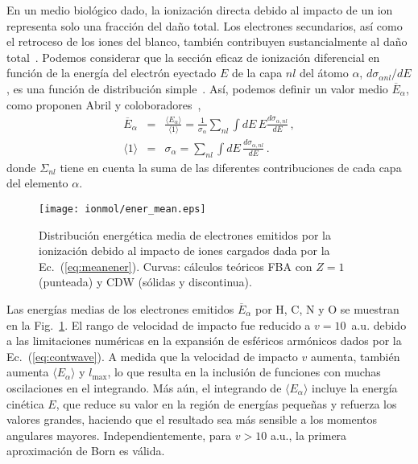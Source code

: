 En un medio biológico dado, la ionización directa debido al impacto de un 
ion representa solo una fracción del daño total. Los electrones 
secundarios, así como el retroceso de los iones del blanco, también 
contribuyen sustancialmente al daño total~\cite{Denifl:11}. Podemos 
considerar que la sección eficaz de ionización diferencial en función de 
la energía del electrón eyectado $E$ de la capa $nl$ del átomo $\alpha$,
$d\sigma_{\alpha nl}/dE$, es una función de distribución 
simple~\cite{Surdutovic:18}. Así, podemos definir un valor medio 
$\overline{E}_{\alpha}$, como proponen Abril y 
coloboradores~\cite{Abril:15},
\begin{eqnarray}
\overline{E}_{\alpha} &=&\frac{\langle E_{\alpha}\rangle}{\langle
1\rangle}=\frac{1}{\sigma_{\alpha}}\sum\limits_{nl}\int dE\,E
\frac{d\sigma_{\alpha,nl}}{dE}\,,  
\label{eq:meanener} \\
\langle 1\rangle &=&\sigma_{\alpha}=\sum\limits_{nl}\int dE\,
\frac{d\sigma_{\alpha,nl}}{dE}\,. 
\label{eq:normener}
\end{eqnarray}
donde $\Sigma_{nl}$ tiene en cuenta la suma de las diferentes 
contribuciones de cada capa del elemento $\alpha$.

\begin{figure}
\centering
\texttt{[image: ionmol/ener\_mean.eps]}
\caption[Distribución energética media de electrones emitidos.]
{Distribución energética media de electrones emitidos por la ionización 
debido al impacto de iones cargados dada por la Ec.~(\ref{eq:meanener}). 
Curvas: cálculos teóricos FBA con $Z=1$ (punteada) y CDW (sólidas y 
discontinua).}
\label{fig:emittedener}
\end{figure} 

Las energías medias de los electrones emitidos $\overline{E}_{\alpha}$ 
por H, C, N y O se muestran en la Fig.~\ref{fig:emittedener}. El rango 
de velocidad de impacto fue reducido a $v=10$~a.u. debido a las 
limitaciones numéricas en la expansión de esféricos armónicos dados por 
la Ec.~(\ref{eq:contwave}). A medida que la velocidad de impacto $v$ 
aumenta, también aumenta $\langle E_{\alpha}\rangle$ y $l_{\max}$, lo que 
resulta en la inclusión de funciones con muchas oscilaciones en el 
integrando. Más aún, el integrando de $\langle E_{\alpha}\rangle$ incluye 
la energía cinética $E$, que reduce su valor en la región de energías 
pequeñas y refuerza los valores grandes, haciendo que el resultado sea 
más sensible a los momentos angulares mayores. Independientemente, para 
$v>10$ a.u., la primera aproximación de Born es válida. 


